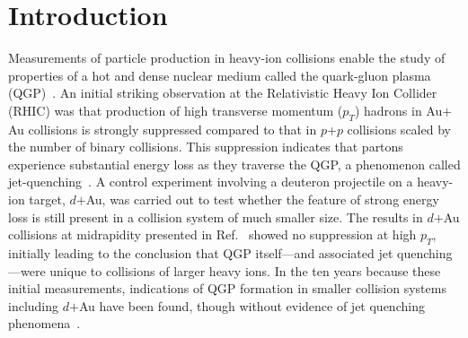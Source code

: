 \documentclass[twocolumn,letterpaper,aps,prc,longbibliography,superscriptaddress,nofootinbib,floatfix]{revtex4-2}
\newcommand{\pt}{\mbox{$p_T$}\xspace}
\newcommand{\pp}{\mbox{$p$+$p$}\xspace}
\newcommand{\dau}{\mbox{$d$$+$Au}\xspace}
\newcommand{\auau}{\mbox{Au$+$Au}\xspace}
\begin{document}
\begin{abstract}

\linenumbers

The PHENIX experiment has studied nuclear effects in $p$$+$Al and 
$p$$+$Au collisions at $\sqrt{s_{_{NN}}}=200$\,GeV on charged hadron 
production at forward rapidity ($1.4<\eta<2.4$, $p$-going direction) and 
backward rapidity ($-2.2<\eta<-1.2$, $A$-going direction).  Such effects 
are quantified by measuring nuclear modification factors as a function 
of transverse momentum and pseudorapidity in various collision 
multiplicity selections. In central $p$$+$Al and $p$$+$Au collisions, a 
suppression (enhancement) is observed at forward (backward) rapidity 
compared to the binary scaled yields in $p$+$p$ collisions. The 
magnitude of enhancement at backward rapidity is larger in $p$$+$Au 
collisions than in $p$$+$Al collisions, which have a smaller number of 
participating nucleons. However, the results at forward rapidity show a 
similar suppression within uncertainties. The results in the integrated 
centrality are compared with calculations using nuclear parton 
distribution functions, which show a reasonable agreement at the forward 
rapidity but fail to describe the backward rapidity enhancement.

\end{abstract}

\maketitle

\section{Introduction}
\label{sec:introduction}

Measurements of particle production in heavy-ion collisions enable the 
study of properties of a hot and dense nuclear medium called the 
quark-gluon plasma 
(QGP)~\cite{Adcox:2004mh,Adams:2005dq,Back:2004je,Arsene:2004fa}. An initial 
striking observation at the Relativistic Heavy Ion Collider (RHIC) was 
that production of high transverse momentum (\pt) hadrons in \auau 
collisions is strongly suppressed compared to that in \pp collisions 
scaled by the number of binary collisions.  This suppression indicates 
that partons experience substantial energy loss as they traverse the 
QGP, a phenomenon called jet-quenching~\cite{Gyulassy:2003mc}. A control 
experiment involving a deuteron projectile on a heavy-ion target, \dau, 
was carried out to test whether the feature of strong energy loss is 
still present in a collision system of much smaller size. The results in 
\dau collisions at midrapidity presented in Ref.~\cite{Adler:2003ii} 
showed no suppression at high \pt, initially leading to the conclusion 
that QGP itself---and associated jet quenching---were unique to 
collisions of larger heavy ions. In the ten years because these initial 
measurements, indications of QGP formation in smaller collision systems 
including \dau have been found, though without evidence of jet quenching 
phenomena~\cite{Nagle:2018nvi}.
\end{document}
